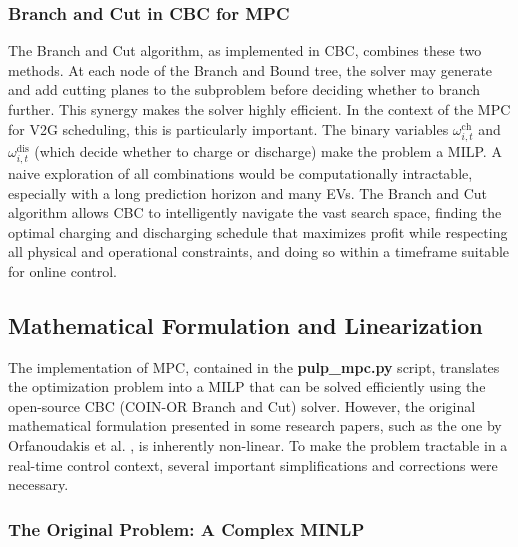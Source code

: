 \subsubsection{Branch and Cut in CBC for MPC}
The Branch and Cut algorithm, as implemented in CBC, combines these two methods. At each node of the Branch and Bound tree, the solver may generate and add cutting planes to the subproblem before deciding whether to branch further. This synergy makes the solver highly efficient.
\noindent
In the context of the MPC for V2G scheduling, this is particularly important. The binary variables $\omega^{\text{ch}}_{i,t}$ and $\omega^{\text{dis}}_{i,t}$ (which decide whether to charge or discharge) make the problem a MILP. A naive exploration of all combinations would be computationally intractable, especially with a long prediction horizon and many EVs. The Branch and Cut algorithm allows CBC to intelligently navigate the vast search space, finding the optimal charging and discharging schedule that maximizes profit while respecting all physical and operational constraints, and doing so within a timeframe suitable for online control.

\subsection{Mathematical Formulation and Linearization}

The implementation of MPC, contained in the \textbf{pulp\_mpc.py} script, translates the optimization problem into a MILP that can be solved efficiently using the open-source CBC (COIN-OR Branch and Cut) solver. However, the original mathematical formulation presented in some research papers, such as the one by Orfanoudakis et al. \cite{orfanoudakis2024ev2gym}, is inherently non-linear. To make the problem tractable in a real-time control context, several important simplifications and corrections were necessary.

\subsubsection{The Original Problem: A Complex MINLP}

